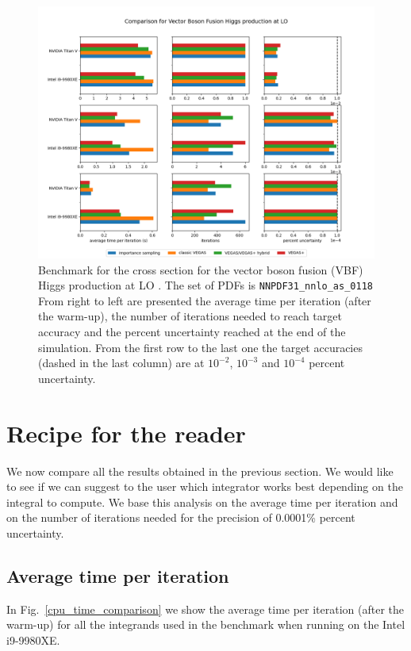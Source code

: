 \documentclass[../main/main.tex]{subfiles}
\begin{document}
\begin{figure}[h]
	\centering
	\includegraphics[width=\textwidth]{../images/higgs_correct.png}
	\caption{Benchmark  for the cross section for the vector boson fusion (VBF) Higgs production at LO \cite{Carrazza:2020qwu}. The set of PDFs is \texttt{NNPDF31\_nnlo\_as\_0118} From right to left are presented the average time per iteration (after the warm-up), the number of iterations needed to reach target accuracy and the percent uncertainty reached at the end of the simulation. From the first row to the last one the target accuracies (dashed in the last column) are at $10^{-2}$, $10^{-3}$ and $10^{-4}$ percent uncertainty.}
	\label{higgs_plot}
\end{figure}

\section{Recipe for the reader}
We now compare all the results obtained in the previous section. We would like to see if we can suggest to the user which integrator works best depending on the integral to compute. We base this analysis on the average time per iteration and on the number of iterations needed for the precision of 0.0001\% percent uncertainty.

\subsection{Average time per iteration}
In Fig.~\ref{cpu_time_comparison} we show the average time per iteration (after the warm-up) for all the integrands used in the benchmark when running on the Intel i9-9980XE.
\end{document}

